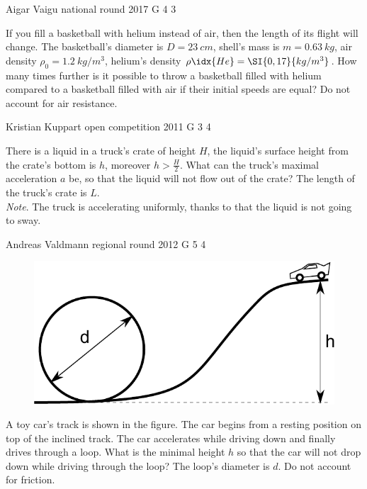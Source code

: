 \documentclass[11pt]{article}
\begin{document}
{Aigar Vaigu} %
{national round} %
{2017} %
{G 4} %
{3} %
{

\ifEngStatement
If you fill a basketball with helium instead of air, then the length of its flight will change. The basketball’s diameter is $D=\SI{23}{cm}$, shell’s mass is $m=\SI{0,63}{kg}$, air density $\rho_0=\SI{1,2}{kg/m^3}$, helium’s density $\rho\idx{He}=\SI{0,17}{kg/m^3}$. How many times further is it possible to throw a basketball filled with helium compared to a basketball filled with air if their initial speeds are equal? Do not account for air resistance.
\fi
}

{Kristian Kuppart} %
{open competition} %
{2011} %
{G 3} %
{4} %
{

\ifEngStatement
There is a liquid in a truck’s crate of height $H$, the liquid’s surface height from the crate’s bottom is $h$, moreover $h > \frac{H}{2}$. What can the truck’s maximal acceleration $a$ be, so that the liquid will not flow out of the crate? The length of the truck’s crate is $L$.\\
\emph{Note}. The truck is accelerating uniformly, thanks to that the liquid is not going to sway.
\fi
}

{Andreas Valdmann} %
{regional round} %
{2012} %
{G 5} %
{4} %
{

\ifEngStatement
\begin{figure}%
\includegraphics[width=\linewidth]{2012-v2g-05-silmus}%
\end{figure}
A toy car’s track is shown in the figure. The car begins from a resting position on top of the inclined track. The car accelerates while driving down and finally drives through a loop. What is the minimal height $h$ so that the car will not drop down while driving through the loop? The loop’s diameter is $d$. Do not account for friction.
\fi
}
\end{document}
